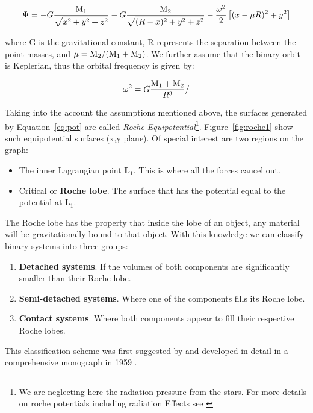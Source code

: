\begin{equation}
        \Psi = - G \frac{\text M _1}{\sqrt{x^2+y^2+z^2}} - G \frac{\text M _2 }{\sqrt{(R - x)^2 + y^2 + z^2}} - \frac{\omega^2 }{2}  \left [ (x- \mu R )^2  + y^2 \right ]    
        \label{eq:pot}
\end{equation}

where G is the gravitational constant, R represents the separation between the point masses, and $\mu = \text M _2/(\text M _1 + \text M _2)$. We further assume that the binary orbit is Keplerian, thus the orbital frequency is given by:

\begin{equation}
        \omega ^2 = G \frac{\text M _1 + \text M _2}{R^3}
/        \label{eq:roche}
\end{equation}

Taking into the account the assumptions mentioned above, the surfaces generated by Equation~\ref{eq:pot} are called \emph{Roche Equipotential}\footnote{We are neglecting here the radiation pressure from the stars. For more details on roche potentials including radiation Effects see \cite{schuerman_roche_1972}}. Figure~\ref{fig:roche1} show such equipotential surfaces (x,y plane). Of special interest are two regions on the graph:
\begin{itemize}
        \item The inner Lagrangian point \textbf{L$_1$}. This is where all the forces cancel out. 
        \item Critical or \textbf{Roche lobe}. The surface that has the potential equal to the potential at L$_1$.
\end{itemize}

The Roche lobe has the property that inside the lobe of an object, any material will be gravitationally bound to that object. With this knowledge we can classify binary systems into three groups:

\begin{enumerate}
        \item \textbf{Detached systems}. If the volumes of both components are significantly smaller than their Roche lobe. 
        \item \textbf{Semi-detached systems}. Where one of the components fills its Roche lobe.
        \item \textbf{Contact systems}. Where both components appear to fill their respective Roche lobes. 
\end{enumerate}

This classification scheme was first suggested by \cite{kopal_classification_1955} and developed in detail in a comprehensive monograph in 1959 \citep{kopal_close_1959}. 

